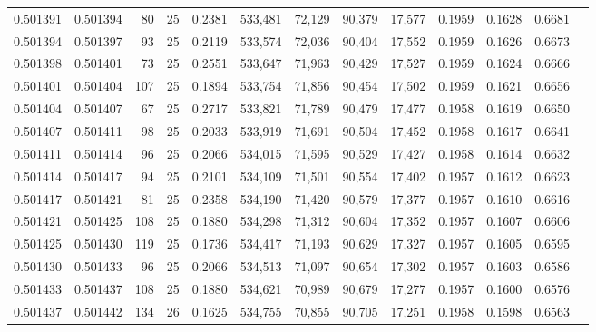 \begin{tabular}{rrrrrrrrrrrrr}
0.501391 & 0.501394 &  80 &  25 &                                     0.2381 & 533,481 &  72,129 &  90,379 &  17,577 & 0.1959 & 0.1628 & 0.6681 \\
0.501394 & 0.501397 &  93 &  25 &                                     0.2119 & 533,574 &  72,036 &  90,404 &  17,552 & 0.1959 & 0.1626 & 0.6673 \\
0.501398 & 0.501401 &  73 &  25 &                                     0.2551 & 533,647 &  71,963 &  90,429 &  17,527 & 0.1959 & 0.1624 & 0.6666 \\
0.501401 & 0.501404 & 107 &  25 &                                     0.1894 & 533,754 &  71,856 &  90,454 &  17,502 & 0.1959 & 0.1621 & 0.6656 \\
0.501404 & 0.501407 &  67 &  25 &                                     0.2717 & 533,821 &  71,789 &  90,479 &  17,477 & 0.1958 & 0.1619 & 0.6650 \\
0.501407 & 0.501411 &  98 &  25 &                                     0.2033 & 533,919 &  71,691 &  90,504 &  17,452 & 0.1958 & 0.1617 & 0.6641 \\
0.501411 & 0.501414 &  96 &  25 &                                     0.2066 & 534,015 &  71,595 &  90,529 &  17,427 & 0.1958 & 0.1614 & 0.6632 \\
0.501414 & 0.501417 &  94 &  25 &                                     0.2101 & 534,109 &  71,501 &  90,554 &  17,402 & 0.1957 & 0.1612 & 0.6623 \\
0.501417 & 0.501421 &  81 &  25 &                                     0.2358 & 534,190 &  71,420 &  90,579 &  17,377 & 0.1957 & 0.1610 & 0.6616 \\
0.501421 & 0.501425 & 108 &  25 &                                     0.1880 & 534,298 &  71,312 &  90,604 &  17,352 & 0.1957 & 0.1607 & 0.6606 \\
0.501425 & 0.501430 & 119 &  25 &                                     0.1736 & 534,417 &  71,193 &  90,629 &  17,327 & 0.1957 & 0.1605 & 0.6595 \\
0.501430 & 0.501433 &  96 &  25 &                                     0.2066 & 534,513 &  71,097 &  90,654 &  17,302 & 0.1957 & 0.1603 & 0.6586 \\
0.501433 & 0.501437 & 108 &  25 &                                     0.1880 & 534,621 &  70,989 &  90,679 &  17,277 & 0.1957 & 0.1600 & 0.6576 \\
0.501437 & 0.501442 & 134 &  26 &                                     0.1625 & 534,755 &  70,855 &  90,705 &  17,251 & 0.1958 & 0.1598 & 0.6563 \\

\end{tabular}
